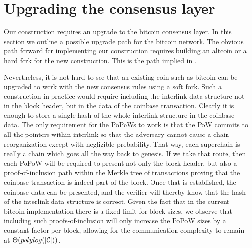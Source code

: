 \section{Upgrading the consensus layer}

Our construction requires an upgrade to the bitcoin consensus layer. In this
section we outline a possible upgrade path for the bitcoin network. The obvious
path forward for implementing our construction requires building an altcoin or
a hard fork for the new construction. This is the path implied in
\cite{KLS}.

Nevertheless, it is not hard to see that an existing coin such as bitcoin can
be upgraded to work with the new consensus rules using a soft fork.  Such a
construction in practice would require including the interlink data structure
not in the block header, but in the data of the coinbase transaction.  Clearly
it is enough to store a single hash of the whole interlink structure in the
coinbase data. The only requirement for the PoPoWs to work is that the
PoW commits to all the pointers within interlink so that the adversary cannot
cause a chain reorganization except with negligible probability. That way, each
superchain is really a chain which goes all the way back to genesis. If we take
that route, then each PoPoW will be required to present not only the block
header, but also a proof-of-inclusion path within the Merkle tree of
transactions proving that the coinbase transaction is indeed part of the block.
Once that is established, the coinbase data can be presented, and the verifier
will thereby know that the hash of the interlink data structure is correct.
Given the fact that in the current bitcoin implementation there is a fixed
limit for block sizes, we observe that including such proofs-of-inclusion will
only increase the PoPoW sizes by a constant factor per block, allowing for the
communication complexity to remain at $\Theta(polylog(|\mathcal{C}|))$.

